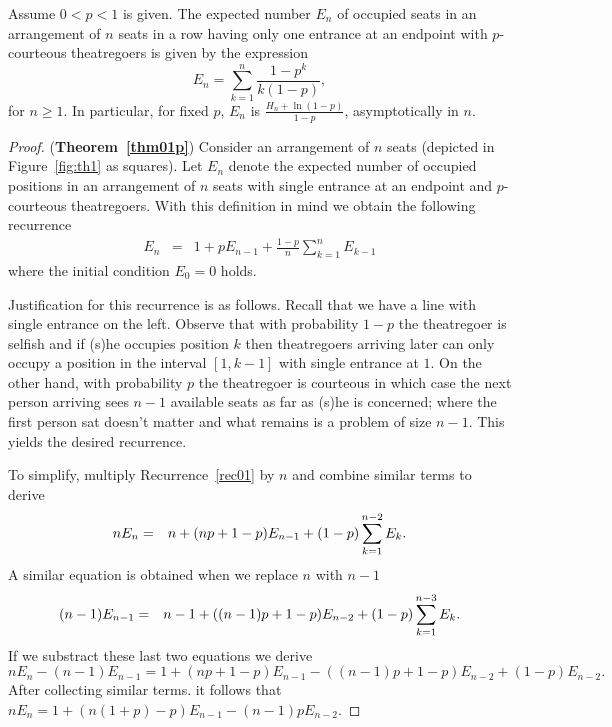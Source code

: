 \documentclass[11pt]{llncs}
\begin{document}
\begin{theorem}
\label{thm01p}
Assume $0 < p < 1$ is given.
The
expected number $E_n$ of occupied seats in an arrangement of $n$ seats
in a row having only one entrance at an endpoint
with $p$-courteous
theatregoers is given by the expression
\begin{equation}
\label{pach1}
E_n = \sum_{k=1}^n \frac{1-p^k}{k(1-p)},
\end{equation}
for $n \geq 1$. In particular, for fixed $p$, $E_n$ is $\frac{H_n + \ln (1-p)}{1-p}$,
asymptotically in $n$.
\end{theorem}
\begin{proof} ({\bf Theorem~\ref{thm01p}})
Consider an arrangement of $n$ seats (depicted in Figure~\ref{fig:th1} as squares).
Let $E_n$ denote the expected number of occupied
positions  in an arrangement of $n$ seats
with single entrance 
at an endpoint
and $p$-courteous
theatregoers.
With this definition in mind we obtain the following
recurrence
\begin{eqnarray}
E_n 
&=& \label{rec01}
1 + p E_{n-1} 
+  \frac{1-p}{n} \sum_{k=1}^n E_{k-1}
\end{eqnarray}
where the initial condition $E_0 =0$ holds.

Justification for this recurrence is as follows.
Recall that we have a line
with single entrance on the left. Observe that with probability $1-p$
the theatregoer is selfish and if (s)he occupies
position $k$ then theatregoers arriving later
can only occupy a position in the interval $[1, k-1]$
with single entrance at $1$.
On the other hand, with probability $p$ the theatregoer is courteous
in which case the next person
arriving sees $n-1$ available seats as 
far as (s)he is concerned; where the first person
sat doesn't matter and what remains is a problem of size $n-1$.
This
yields the desired recurrence.

To simplify, multiply Recurrence~\eqref{rec01} by $n$
and combine similar terms to derive
\begin{eqnarray}
nE_n 
&=& \notag
n + (np+1-p)E_{n-1} + (1-p) \sum_{k=1}^{n-2} E_k .
\end{eqnarray}
A similar equation is obtained when we replace $n$ with $n-1$
\begin{eqnarray}
(n-1)E_{n-1} 
&=& \notag
n-1 + ((n-1)p+1-p)E_{n-2} + (1-p) \sum_{k=1}^{n-3} E_k .
\end{eqnarray}
If we substract these last two equations
we derive
$
nE_n -(n-1)E_{n-1}=
1 + (np+1-p)E_{n-1} - ((n-1)p+1-p)E_{n-2}
+(1-p) E_{n-2} .
$
After collecting similar terms. it follows that 
$nE_n = 1+ (n(1+p) -p) E_{n-1} -(n-1)p E_{n-2}$.


\end{proof}
\end{document}

